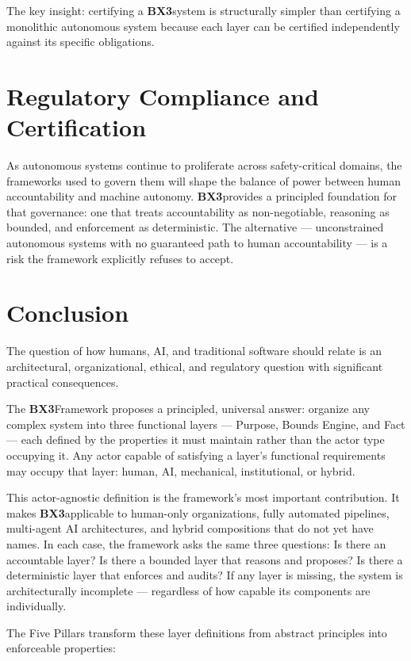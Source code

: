 \documentclass[12pt]{article}
\newcommand{\bxthree}{\textbf{BX3}}
\begin{document}
The key insight: certifying a \bxthree system is structurally simpler than certifying a monolithic autonomous system because each layer can be certified independently against its specific obligations.

\section{Regulatory Compliance and Certification}
\label{sec:regulatory}

As autonomous systems continue to proliferate across safety-critical domains, the frameworks used to govern them will shape the balance of power between human accountability and machine autonomy. \bxthree provides a principled foundation for that governance: one that treats accountability as non-negotiable, reasoning as bounded, and enforcement as deterministic. The alternative --- unconstrained autonomous systems with no guaranteed path to human accountability --- is a risk the framework explicitly refuses to accept.

\section{Conclusion}
\label{sec:conclusion}

The question of how humans, AI, and traditional software should relate is an architectural, organizational, ethical, and regulatory question with significant practical consequences.

The \bxthree Framework proposes a principled, universal answer: organize any complex system into three functional layers --- Purpose, Bounds Engine, and Fact --- each defined by the properties it must maintain rather than the actor type occupying it. Any actor capable of satisfying a layer's functional requirements may occupy that layer: human, AI, mechanical, institutional, or hybrid.

This actor-agnostic definition is the framework's most important contribution. It makes \bxthree applicable to human-only organizations, fully automated pipelines, multi-agent AI architectures, and hybrid compositions that do not yet have names. In each case, the framework asks the same three questions: Is there an accountable layer? Is there a bounded layer that reasons and proposes? Is there a deterministic layer that enforces and audits? If any layer is missing, the system is architecturally incomplete --- regardless of how capable its components are individually.

The Five Pillars transform these layer definitions from abstract principles into enforceable properties:
\end{document}
